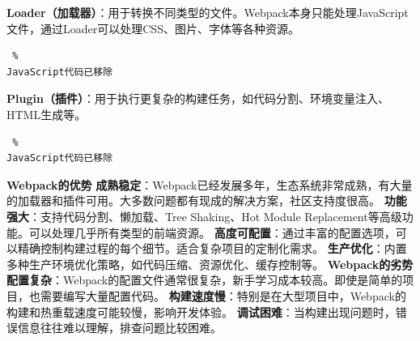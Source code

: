 \textbf{Loader（加载器）}：用于转换不同类型的文件。Webpack本身只能处理JavaScript文件，通过Loader可以处理CSS、图片、字体等各种资源。 \begin{lstlisting} %
JavaScript代码已移除 \end{lstlisting} \textbf{Plugin（插件）}：用于执行更复杂的构建任务，如代码分割、环境变量注入、HTML生成等。 \begin{lstlisting} %
JavaScript代码已移除 \end{lstlisting} \textbf{Webpack的优势}
\textbf{成熟稳定}：Webpack已经发展多年，生态系统非常成熟，有大量的加载器和插件可用。大多数问题都有现成的解决方案，社区支持度很高。 \textbf{功能强大}：支持代码分割、懒加载、Tree Shaking、Hot
Module Replacement等高级功能。可以处理几乎所有类型的前端资源。 \textbf{高度可配置}：通过丰富的配置选项，可以精确控制构建过程的每个细节。适合复杂项目的定制化需求。
\textbf{生产优化}：内置多种生产环境优化策略，如代码压缩、资源优化、缓存控制等。 \textbf{Webpack的劣势}
\textbf{配置复杂}：Webpack的配置文件通常很复杂，新手学习成本较高。即使是简单的项目，也需要编写大量配置代码。 \textbf{构建速度慢}：特别是在大型项目中，Webpack的构建和热重载速度可能较慢，影响开发体验。
\textbf{调试困难}：当构建出现问题时，错误信息往往难以理解，排查问题比较困难。

